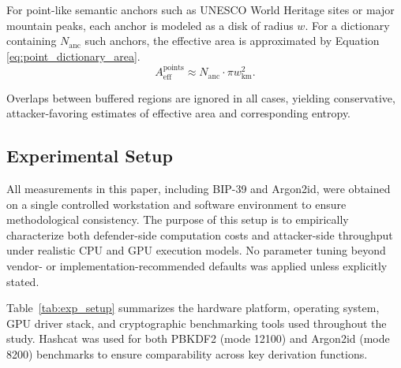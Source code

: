 \documentclass[mathematics,article,accept,pdftex,moreauthors]{Definitions/mdpi}
\begin{document}
For point-like semantic anchors such as UNESCO World Heritage sites or major mountain peaks, each anchor is modeled as a disk of radius $w$. For a dictionary containing $N_{\text{anc}}$ such anchors, the effective area is approximated by Equation \eqref{eq:point_dictionary_area}.
\begin{equation}
A_{\text{eff}}^{\text{points}} \approx N_{\text{anc}} \cdot \pi w_{\text{km}}^2.
\label{eq:point_dictionary_area}
\end{equation}

Overlaps between buffered regions are ignored in all cases, yielding conservative, attacker-favoring estimates of effective area and corresponding entropy.


\subsection{Experimental Setup}
\label{sec:experimental_setup}

All measurements in this paper, including BIP-39 and Argon2id, were obtained on a single controlled workstation and software environment to ensure methodological consistency. The purpose of this setup is to empirically characterize both defender-side computation costs and attacker-side throughput under realistic CPU and GPU execution models. No parameter tuning beyond vendor- or implementation-recommended defaults was applied unless explicitly stated.

Table~\ref{tab:exp_setup} summarizes the hardware platform, operating system, GPU driver stack, and cryptographic benchmarking tools used throughout the study. Hashcat was used for both PBKDF2 (mode 12100) and Argon2id (mode 8200) benchmarks to ensure comparability across key derivation functions.
\end{document}
